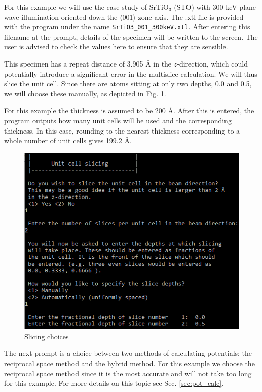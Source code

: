 \documentclass[12pt,a4paper]{article}
\begin{document}
For this example we will use the case study of SrTiO$_3$ (STO) with 300 keV plane wave illumination oriented down the $\langle 001 \rangle$ zone axis.
The .xtl file is provided with the program under the name \verb|SrTiO3_001_300keV.xtl|.
After entering this filename at the prompt, details of the specimen will be written to the screen.
The user is advised to check the values here to ensure that they are sensible.

This specimen has a repeat distance of 3.905 \AA{} in the $z$-direction, which could potentially introduce a significant error in the multislice calculation.
We will thus slice the unit cell.
Since there are atoms sitting at only two depths, 0.0 and 0.5, we will choose these manually, as depicted in Fig. \ref{fig:pw_abs_slicing}.

For this example the thickness is assumed to be 200 \AA{}.
After this is entered, the program outputs how many unit cells will be used and the corresponding thickness.
In this case, rounding to the nearest thickness corresponding to a whole number of unit cells gives 199.2 \AA{}.
    
\begin{figure}[!h]
\begin{center}
    \includegraphics[scale=0.75]{figures/pw_abs_slicing.png}
\caption{Slicing choices}
\label{fig:pw_abs_slicing}
\end{center}
\end{figure}

The next prompt is a choice between two methods of calculating potentials: the reciprocal space method and the hybrid method.
For this example we choose the reciprocal space method since it is the most accurate and will not take too long for this example.
For more details on this topic see Sec. \ref{sec:pot_calc}.
\end{document}
